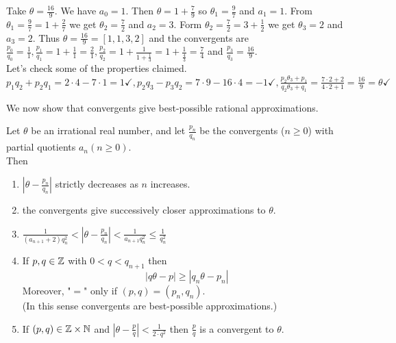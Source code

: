 \documentclass[NumTh.tex]{subfiles}
\begin{document}
\begin{ex*}
  Take $\theta = \frac{16}{9}$. We have $a_0 = 1$. Then $\theta = 1 + \frac{7}{9}$ so $\theta_1 = \frac{9}{7}$ and $a_1 = 1$. 
  From $\theta_1 = \frac{9}{7} = 1 + \frac{2}{7}$ we get $\theta_2 = \frac{7}{2}$ and $a_2 = 3$.
  Form $\theta_2 = \frac{7}{2} = 3 + \frac{1}{2}$ we get $\theta_3 = 2$ and $a_3 = 2$.
  Thus $\theta = \frac{16}{9} = [1,1,3,2]$ and the convergents are $\frac{p_0}{q_0} = \frac{1}{1}, \frac{p_1}{q_1} = 1 + \frac{1}{1} = \frac{2}{1}, \frac{p_2}{q_2} = 1 + \frac{1}{1+\frac{1}{3}} = 1 + \frac{1}{\frac{4}{3}} = \frac{7}{4}$ 
  and $\frac{p_3}{q_3} = \frac{16}{9}$. \\
  Let's check some of the properties claimed.\\
  $p_1 q_2 + p_2 q_1 = 2\cdot 4 - 7 \cdot 1 = 1 \checkmark, p_2 q_3 - p_3 q_2 = 7\cdot 9 - 16 \cdot 4 = -1 \checkmark,
  \frac{p_2 \theta_3 + p_1}{q_2 \theta_3 +q_1} = \frac{ 7 \cdot 2 + 2}{4 \cdot 2 +1} = \frac{16}{9} = \theta \checkmark$
\end{ex*}

We now show that convergents give best-possible rational approximations.
\begin{theorem}
  Let $\theta$ be an irrational real number, and let $\frac{p_n}{q_n}$ be the convergents ($n \geq 0$) with partial quotients $a_n (n \geq 0)$.\\
  Then
  \begin{enumerate} %
    \item $ | \theta - \frac{p_n}{q_n}|$ strictly decreases as $n$ increases.
    \item the convergents give successively closer approximations to $\theta$.
    \item $\frac{1}{(a_{n+1} + 2) q_n^2} < |\theta - \frac{p_n}{q_n}| < \frac{1}{a_{n+1} q_n^2} \leq \frac{1}{q_n^2}$
    \item If $p,q \in \mathbb{Z}$ with $0 < q < q_{n+1}$ then
    \[ |q \theta - p| \geq |q_n \theta - p_n| \]
    Moreover, "$=$" only if $(p,q) = (p_n,q_n)$.\\
    (In this sense convergents are best-possible approximations.)
    \item If $(p,q) \in \mathbb{Z} \times \mathbb{N}$ and $|\theta - \frac{p}{q}| < \frac{1}{2\cdot q^2}$ then $\frac{p}{q}$ is a convergent to $\theta$.
  \end{enumerate}
\end{theorem}
\end{document}
